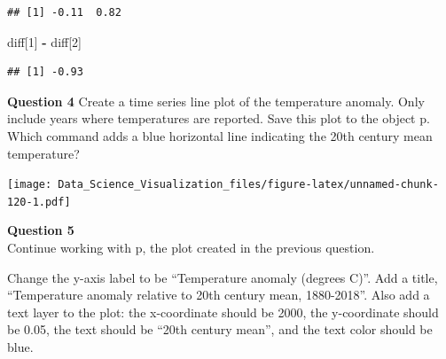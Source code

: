 \documentclass[
]{article}
\newenvironment{Shaded}{\begin{snugshade}}{\end{snugshade}}
\newcommand{\DataTypeTok}[1]{\textcolor[rgb]{0.13,0.29,0.53}{#1}}
\newcommand{\DecValTok}[1]{\textcolor[rgb]{0.00,0.00,0.81}{#1}}
\newcommand{\KeywordTok}[1]{\textcolor[rgb]{0.13,0.29,0.53}{\textbf{#1}}}
\newcommand{\NormalTok}[1]{#1}
\newcommand{\OperatorTok}[1]{\textcolor[rgb]{0.81,0.36,0.00}{\textbf{#1}}}
\newcommand{\StringTok}[1]{\textcolor[rgb]{0.31,0.60,0.02}{#1}}
\begin{document}
\begin{verbatim}
## [1] -0.11  0.82
\end{verbatim}

\begin{Shaded}
\begin{Highlighting}[]
\NormalTok{diff[}\DecValTok{1}\NormalTok{] }\OperatorTok{-}\StringTok{ }\NormalTok{diff[}\DecValTok{2}\NormalTok{]}
\end{Highlighting}
\end{Shaded}

\begin{verbatim}
## [1] -0.93
\end{verbatim}

\textbf{Question 4} Create a time series line plot of the temperature
anomaly. Only include years where temperatures are reported. Save this
plot to the object p.\\
Which command adds a blue horizontal line indicating the 20th century
mean temperature?

\begin{Shaded}
\end{Shaded}

\texttt{[image: Data\_Science\_Visualization\_files/figure-latex/unnamed-chunk-120-1.pdf]}

\textbf{Question 5}\\
Continue working with p, the plot created in the previous question.

Change the y-axis label to be ``Temperature anomaly (degrees C)''. Add a
title, ``Temperature anomaly relative to 20th century mean, 1880-2018''.
Also add a text layer to the plot: the x-coordinate should be 2000, the
y-coordinate should be 0.05, the text should be ``20th century mean'',
and the text color should be blue.
\end{document}
